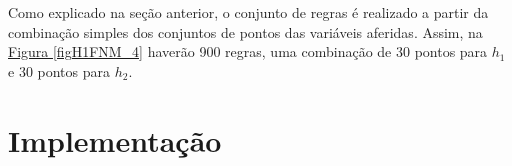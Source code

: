 Como explicado na seção anterior, o conjunto de regras é realizado a partir da combinação simples dos conjuntos de pontos das variáveis aferidas. Assim, na \hyperref[figH1FNM_4]{Figura \ref{figH1FNM_4}} haverão 900 regras, uma combinação de 30 pontos para $h_1$ e 30 pontos para $h_2$.


\section{Implementação}

%

